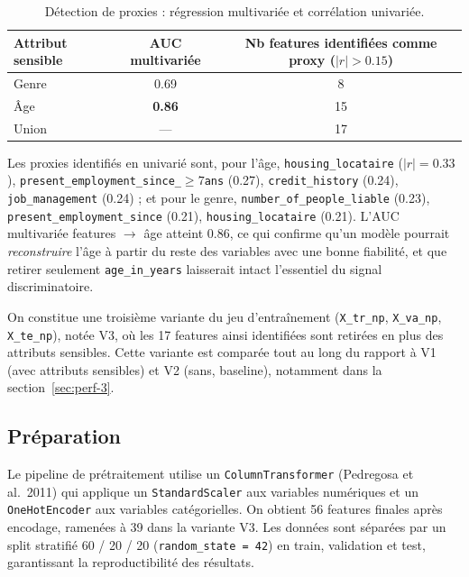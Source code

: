 \documentclass[11pt, a4paper]{article}
\begin{document}
\begin{table}[H]
\centering
\begin{tabular}{lcc}
\toprule
\textbf{Attribut sensible} & \textbf{AUC multivariée} & \textbf{Nb features identifiées comme proxy} ($|r|>0.15$) \\
\midrule
Genre & 0.69 & 8 \\
Âge   & \textbf{0.86} & 15 \\
\midrule
Union & --- & 17 \\
\bottomrule
\end{tabular}
\caption{Détection de proxies : régression multivariée et corrélation univariée.}
\end{table}

Les proxies identifiés en univarié sont, pour l'âge, \texttt{housing\_locataire} ($|r|=0.33$), \texttt{present\_employment\_since\_$\geq 7$ans} (0.27), \texttt{credit\_history} (0.24), \texttt{job\_management} (0.24) ; et pour le genre, \texttt{number\_of\_people\_liable} (0.23), \texttt{present\_employment\_since} (0.21), \texttt{housing\_locataire} (0.21). L'AUC multivariée features $\to$ âge atteint 0.86, ce qui confirme qu'un modèle pourrait \emph{reconstruire} l'âge à partir du reste des variables avec une bonne fiabilité, et que retirer seulement \texttt{age\_in\_years} laisserait intact l'essentiel du signal discriminatoire.

\begin{leconbox}
On constitue une troisième variante du jeu d'entraînement (\texttt{X\_tr\_np}, \texttt{X\_va\_np}, \texttt{X\_te\_np}), notée V3, où les 17 features ainsi identifiées sont retirées en plus des attributs sensibles. Cette variante est comparée tout au long du rapport à V1 (avec attributs sensibles) et V2 (sans, baseline), notamment dans la section~\ref{sec:perf-3}.
\end{leconbox}

\subsection{Préparation}

Le pipeline de prétraitement utilise un \texttt{ColumnTransformer} (Pedregosa et al.\ 2011) qui applique un \texttt{StandardScaler} aux variables numériques et un \texttt{OneHotEncoder} aux variables catégorielles. On obtient 56 features finales après encodage, ramenées à 39 dans la variante V3. Les données sont séparées par un split stratifié 60 / 20 / 20 (\texttt{random\_state = 42}) en train, validation et test, garantissant la reproductibilité des résultats.
\end{document}
